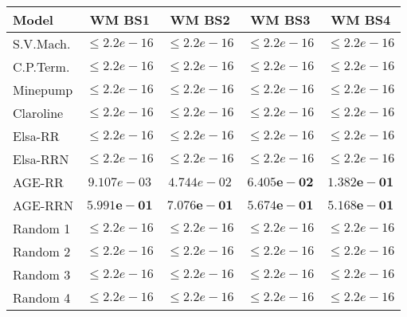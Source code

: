 \begin{small} 
\begin{tabular}{lcccc}
\hline 
\textbf{Model} & \textbf{ WM BS1 } & \textbf{ WM BS2 } & \textbf{ WM BS3 } & \textbf{ WM BS4 } \\ 
\hline 
S.V.Mach.   & $\le 2.2e-16$ & $\le 2.2e-16$ & $\le 2.2e-16$ & $\le 2.2e-16$\\ 
C.P.Term.   & $\le 2.2e-16$ & $\le 2.2e-16$ & $\le 2.2e-16$ & $\le 2.2e-16$\\ 
Minepump    & $\le 2.2e-16$ & $\le 2.2e-16$ & $\le 2.2e-16$ & $\le 2.2e-16$\\ 
Claroline   & $\le 2.2e-16$ & $\le 2.2e-16$ & $\le 2.2e-16$ & $\le 2.2e-16$\\ 
Elsa-RR     & $\le 2.2e-16$ & $\le 2.2e-16$ & $\le 2.2e-16$ & $\le 2.2e-16$\\ 
Elsa-RRN    & $\le 2.2e-16$ & $\le 2.2e-16$ & $\le 2.2e-16$ & $\le 2.2e-16$\\ 
AGE-RR      & $9.107e-03$ & $4.744e-02$ & $\mathbf{6.405e-02}$ & $\mathbf{1.382e-01}$\\ 
AGE-RRN     & $\mathbf{5.991e-01}$ & $\mathbf{7.076e-01}$ & $\mathbf{5.674e-01}$ & $\mathbf{5.168e-01}$\\ 
Random 1    & $\le 2.2e-16$ & $\le 2.2e-16$ & $\le 2.2e-16$ & $\le 2.2e-16$\\ 
Random 2    & $\le 2.2e-16$ & $\le 2.2e-16$ & $\le 2.2e-16$ & $\le 2.2e-16$\\ 
Random 3    & $\le 2.2e-16$ & $\le 2.2e-16$ & $\le 2.2e-16$ & $\le 2.2e-16$\\ 
Random 4    & $\le 2.2e-16$ & $\le 2.2e-16$ & $\le 2.2e-16$ & $\le 2.2e-16$\\ 
\hline 
\end{tabular} 
\end{small}
